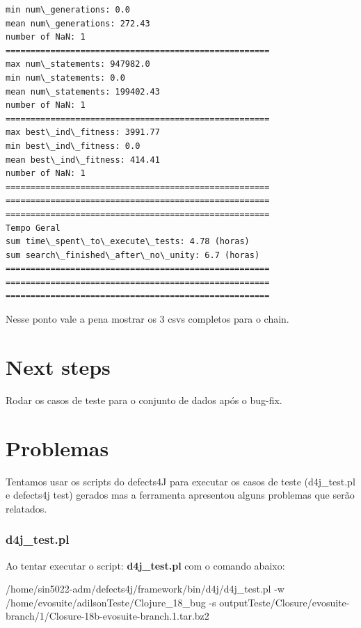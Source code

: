 \documentclass[11pt]{article}
\newenvironment{Shaded}{}{}
\newcommand{\NormalTok}[1]{{#1}}
\newcommand{\ExtensionTok}[1]{{#1}}
\begin{document}
\begin{Verbatim}[commandchars=\\\{\}]
min num\_generations: 0.0
mean num\_generations: 272.43
number of NaN: 1
=====================================================
max num\_statements: 947982.0
min num\_statements: 0.0
mean num\_statements: 199402.43
number of NaN: 1
=====================================================
max best\_ind\_fitness: 3991.77
min best\_ind\_fitness: 0.0
mean best\_ind\_fitness: 414.41
number of NaN: 1
=====================================================
=====================================================
=====================================================
Tempo Geral
sum time\_spent\_to\_execute\_tests: 4.78 (horas)
sum search\_finished\_after\_no\_unity: 6.7 (horas)
=====================================================
=====================================================
=====================================================

    \end{Verbatim}

    Nesse ponto vale a pena mostrar os 3 csvs completos para o chain.

    \hypertarget{next-steps}{%
\section{Next steps}\label{next-steps}}
Rodar os casos de teste para o conjunto de dados após o bug-fix.
    \hypertarget{problemas}{%
\section{Problemas}\label{problemas}}

    Tentamos usar os scripts do defects4J para executar os casos de teste
(d4j\_test.pl e defects4j test) gerados mas a ferramenta apresentou
alguns problemas que serão relatados.

    \hypertarget{d4j_test.pl}{%
\subsubsection{d4j\_test.pl}\label{d4j_test.pl}}

    Ao tentar executar o script: \textbf{d4j\_test.pl} com o comando abaixo:

    \begin{Shaded}
\begin{Highlighting}[]
\ExtensionTok{/home/sin5022-adm/defects4j/framework/bin/d4j/d4j_test.pl}\NormalTok{  -w /home/evosuite/adilsonTeste/Clojure_18_bug -s outputTeste/Closure/evosuite-branch/1/Closure-18b-evosuite-branch.1.tar.bz2}
\end{Highlighting}
\end{Shaded}
\end{document}
